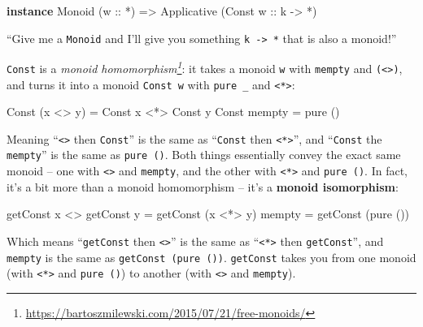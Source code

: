 \documentclass[]{article}
\newenvironment{Shaded}{}{}
\newcommand{\DataTypeTok}[1]{\textcolor[rgb]{0.56,0.13,0.00}{#1}}
\newcommand{\FunctionTok}[1]{\textcolor[rgb]{0.02,0.16,0.49}{#1}}
\newcommand{\KeywordTok}[1]{\textcolor[rgb]{0.00,0.44,0.13}{\textbf{#1}}}
\newcommand{\NormalTok}[1]{#1}
\newcommand{\OtherTok}[1]{\textcolor[rgb]{0.00,0.44,0.13}{#1}}
\renewcommand{\href}[2]{#2\footnote{\url{#1}}}
\begin{document}
\begin{Shaded}
\begin{Highlighting}[]
\KeywordTok{instance} \DataTypeTok{Monoid}\NormalTok{ (}\OtherTok{w ::} \FunctionTok{*}\NormalTok{) }\OtherTok{=>} \DataTypeTok{Applicative}\NormalTok{ (}\DataTypeTok{Const}\OtherTok{ w ::}\NormalTok{ k }\OtherTok{->} \FunctionTok{*}\NormalTok{)}
\end{Highlighting}
\end{Shaded}

``Give me a \texttt{Monoid} and I'll give you something
\texttt{k\ -\textgreater{}\ *} that is also a monoid!''

\texttt{Const} is a
\emph{\href{https://bartoszmilewski.com/2015/07/21/free-monoids/}{monoid
homomorphism}}: it takes a monoid \texttt{w} with \texttt{mempty} and
\texttt{(\textless{}\textgreater{})}, and turns it into a monoid
\texttt{Const\ w} with \texttt{pure\ \_} and
\texttt{\textless{}*\textgreater{}}:

\begin{Shaded}
\begin{Highlighting}[]
\DataTypeTok{Const}\NormalTok{ (x }\FunctionTok{<>}\NormalTok{ y) }\FunctionTok{=} \DataTypeTok{Const}\NormalTok{ x }\FunctionTok{<*>} \DataTypeTok{Const}\NormalTok{ y}
\DataTypeTok{Const}\NormalTok{ mempty   }\FunctionTok{=}\NormalTok{ pure ()}
\end{Highlighting}
\end{Shaded}

Meaning ``\texttt{\textless{}\textgreater{}} then \texttt{Const}'' is the same
as ``\texttt{Const} then \texttt{\textless{}*\textgreater{}}'', and
``\texttt{Const} the \texttt{mempty}'' is the same as \texttt{pure\ ()}. Both
things essentially convey the exact same monoid -- one with
\texttt{\textless{}\textgreater{}} and \texttt{mempty}, and the other with
\texttt{\textless{}*\textgreater{}} and \texttt{pure\ ()}. In fact, it's a bit
more than a monoid homomorphism -- it's a \textbf{monoid isomorphism}:

\begin{Shaded}
\begin{Highlighting}[]
\NormalTok{getConst x }\FunctionTok{<>}\NormalTok{ getConst y }\FunctionTok{=}\NormalTok{ getConst (x }\FunctionTok{<*>}\NormalTok{ y)}
\NormalTok{mempty                   }\FunctionTok{=}\NormalTok{ getConst (pure ())}
\end{Highlighting}
\end{Shaded}

Which means ``\texttt{getConst} then \texttt{\textless{}\textgreater{}}'' is the
same as ``\texttt{\textless{}*\textgreater{}} then \texttt{getConst}'', and
\texttt{mempty} is the same as \texttt{getConst\ (pure\ ())}. \texttt{getConst}
takes you from one monoid (with \texttt{\textless{}*\textgreater{}} and
\texttt{pure\ ()}) to another (with \texttt{\textless{}\textgreater{}} and
\texttt{mempty}).
\end{document}
